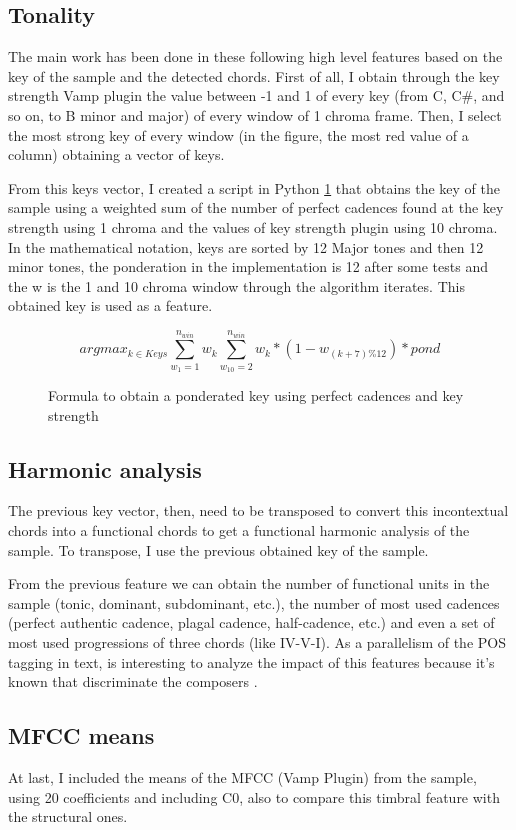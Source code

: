 \documentclass{article}
\begin{document}
\subsection{Tonality}\label{subsec:chord_windows}
The main work has been done in these following high level features based on the key of the sample and the detected chords. First of all, I obtain through the key strength Vamp plugin the value between -1 and 1 of every key (from C, C\#, and so on, to B minor and major) of every window of 1 chroma frame. Then, I select the most strong key of every window (in the figure, the most red value of a column) obtaining a vector of keys.

From this keys vector, I created a script in Python \ref{fig:keyFormula} that obtains the key of the sample using a weighted sum of the number of perfect cadences found at the key strength using 1 chroma and the values of key strength plugin using 10 chroma. In the mathematical notation, keys are sorted by 12 Major tones and then 12 minor tones, the ponderation in the implementation is 12 after some tests and the w is the 1 and 10 chroma window through the algorithm iterates. This obtained key is used as a feature.

\begin{figure}
\[ argmax_{k \in Keys} \sum_{w_{1}=1}^{n_{win}} w_k \sum_{w_{10}=2}^{n_{win}} w_k * (1-w_{(k+7)\%12})*pond \]
\caption{Formula to obtain a ponderated key using perfect cadences and key strength} \label{fig:keyFormula}
\end{figure}


\subsection{Harmonic analysis}\label{subsec:uni_bi_tri}
The previous key vector, then, need to be transposed to convert this incontextual chords into a functional chords to get a functional harmonic analysis of the sample. To transpose, I use the previous obtained key of the sample.

From the previous feature we can obtain the number of functional units in the sample (tonic, dominant, subdominant, etc.), the number of most used cadences (perfect authentic cadence, plagal cadence, half-cadence, etc.) and even a set of most used progressions of three chords (like IV-V-I). As a parallelism of the POS tagging in text, is interesting to analyze the impact of this features because it's known that discriminate the composers \cite{desportes}.

\subsection{MFCC means}\label{subsec:mfcc_means}
At last, I included the means of the MFCC (Vamp Plugin) from the sample, using 20 coefficients and including C0, also to compare this timbral feature with the structural ones.
\end{document}
